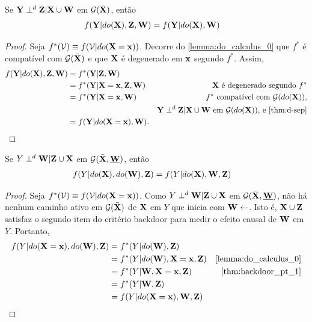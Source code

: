 \section{}

\subsection{}

\begin{lemma}
 \label{lemma:do_calculus_1}
 Se ${\mathbf{Y}} \perp^d {\mathbf{Z}} | {\mathbf{X}} \cup {\mathbf{W}}$ em ${\mathcal G}(\bar{{\mathbf{X}}})$, então
 \begin{align*}
  f({\mathbf{Y}}|do({\mathbf{X}}), {\mathbf{Z}}, {\mathbf{W}}) &= f({\mathbf{Y}}|do({\mathbf{X}}), {\mathbf{W}})
 \end{align*}
\end{lemma}

\begin{proof}
 Seja $f^*({\mathcal V}) \equiv f({\mathcal V}|do({\mathbf{X}}={\mathbf{x}}))$. 
 Decorre do \cref{lemma:do_calculus_0} que
 $f^*$ é compatível com ${\mathcal G}(\bar{{\mathbf{X}}})$ e que
 ${\mathbf{X}}$ é degenerado em ${\mathbf{x}}$ segundo $f^*$.
 Assim,
 \begin{align*}
  f(\Y|do(\X), \Z, \W)
  &= f^*(\Y|\Z, \W) \\
  &= f^*(\Y|\X=\x, \Z, \W)
  & \X \text{ é degenerado segundo }  f^* \\
  &= f^*(\Y|\X=\x, \W)
  & f^* \text{ compatível com } \sG(do(\X)) \text{,} \\
  && \Y \dsep \Z | \X \cup \W \text{ em } \sG(do(\X)) \text{, e \cref{thm:d-sep}} \\
  &= f(\Y|do(\X=\x), \W).
 \end{align*}
\end{proof}

\begin{lemma}
 \label{lemma:do_calculus_2}
 Se $Y \perp^d {\mathbf{W}} | {\mathbf{Z}} \cup {\mathbf{X}}$ em
 ${\mathcal G}(\bar{{\mathbf{X}}}, \underline{{\mathbf{W}}})$, então
 \begin{align*}
  f(Y|do({\mathbf{X}}),do({\mathbf{W}}),{\mathbf{Z}}) &= f(Y|do({\mathbf{X}}),{\mathbf{W}},{\mathbf{Z}})
 \end{align*}
\end{lemma}

\begin{proof}
 Seja $f^*({\mathcal V}) \equiv f({\mathcal V}|do({\mathbf{X}}={\mathbf{x}}))$. 
 Como $Y \perp^d {\mathbf{W}} | {\mathbf{Z}} \cup {\mathbf{X}}$ 
 em ${\mathcal G}(\bar{{\mathbf{X}}}, \underline{{\mathbf{W}}})$, 
 não há nenhum caminho ativo em ${\mathcal G}(\bar{{\mathbf{X}}})$
 de ${\mathbf{X}}$ em $Y$ que inicia com ${\mathbf{W}} \leftarrow$.
 Isto é, ${\mathbf{X}} \cup {\mathbf{Z}}$ satisfaz 
 o segundo item do critério backdoor para
 medir o efeito causal de ${\mathbf{W}}$ em $Y$.
 Portanto,
 \begin{align*}
  f(Y|do(\X=\x),do(\W),\Z)
  &= f^*(Y|do(\W),\Z) \\
  &= f^*(Y|do(\W),\X=\x,\Z)
  & \text{\cref{lemma:do_calculus_0}} \\
  &= f^*(Y|\W,\X=\x,\Z)
  & \text{\cref{thm:backdoor_pt_1}} \\
  &= f^*(Y|\W,\Z) \\
  &= f(Y|do(\X=\x),\W,\Z)
 \end{align*}
\end{proof}

